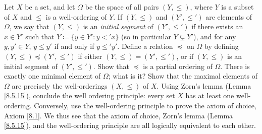 \begin{exercise}\label{ex 8.5.19}
    Let \(X\) be a set, and let \(\Omega\) be the space of all pairs \((Y, \leq)\), where \(Y\) is a subset of \(X\) and \(\leq\) is a well-ordering of \(Y\).
    If \((Y, \leq)\) and \((Y', \leq')\) are elements of \(\Omega\), we say that \((Y, \leq)\) is an \emph{initial segment} of \((Y', \leq')\) if there exists an \(x \in Y'\) such that \(Y \coloneqq \{y \in Y' : y <' x\}\) (so in particular \(Y \subsetneq Y'\)), and for any \(y, y' \in Y\), \(y \leq y'\) if and only if \(y \leq' y'\).
    Define a relation \(\preceq\) on \(\Omega\) by defining \((Y, \leq) \preceq (Y', \leq')\) if either \((Y, \leq) = (Y', \leq')\), or if \((Y, \leq)\) is an initial segment of \((Y', \leq')\).
    Show that \(\preceq\) is a partial ordering of \(\Omega\).
    There is exactly one minimal element of \(\Omega\);
    what is it?
    Show that the maximal elements of \(\Omega\) are precisely the well-orderings \((X, \leq)\) of \(X\).
    Using Zorn's lemma (Lemma \ref{8.5.15}), conclude the well ordering principle:
    every set \(X\) has at least one well-ordering.
    Conversely, use the well-ordering principle to prove the axiom of choice, Axiom \ref{8.1}.
    We thus see that the axiom of choice, Zorn's lemma (Lemma \ref{8.5.15}), and the well-ordering principle are all logically equivalent to each other.
\end{exercise}

\begin{exercise}\label{ex 8.5.20}

\end{exercise}